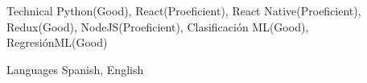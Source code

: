 
\begin{cvskills}

  \cvskill
  {Technical} %
  {Python(Good), React(Proeficient), React Native(Proeficient), Redux(Good), NodeJS(Proeficient), Clasificación ML(Good), RegresiónML(Good)} %

  \cvskill
  {Languages} %
  {Spanish, English} %

\end{cvskills}
